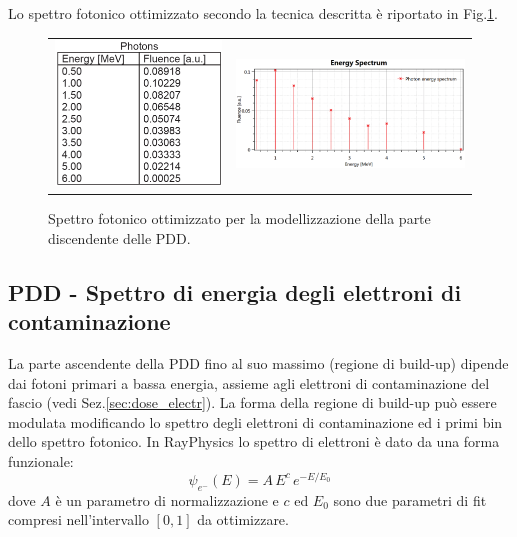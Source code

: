 Lo spettro fotonico ottimizzato secondo la tecnica descritta è riportato in Fig.\ref{fig:Ray_spectr_fot}.
\begin{figure}
\centering
\begin{tabular}{m{}m{}}
\vspace*{-0.5cm}\includegraphics[width=.32\textwidth]{./cap2/Ray_spectrum_fot_tab.png} &
\includegraphics[width=.65\textwidth]{./cap2/Ray_spectrum_fot.png}
\end{tabular}
\caption{Spettro fotonico ottimizzato per la modellizzazione della parte discendente delle PDD.}
\label{fig:Ray_spectr_fot}
\end{figure}

\subsection{PDD - Spettro di energia degli elettroni di contaminazione}
La parte ascendente della PDD fino al suo massimo (regione di build-up) dipende dai fotoni primari a bassa energia, assieme agli elettroni di contaminazione del fascio (vedi Sez.\ref{sec:dose_electr}). La forma della regione di build-up può essere modulata modificando lo spettro degli elettroni di contaminazione ed i primi bin dello spettro fotonico. In RayPhysics lo spettro di elettroni è dato da una forma funzionale:
\begin{equation}
\psi_{e^-} (E) = A\,E^c\, e^{-E/E_0}
\end{equation}
dove $A$ è un parametro di normalizzazione e $c$ ed $E_0$ sono due parametri di fit compresi nell'intervallo $[0,1]$ da ottimizzare.

